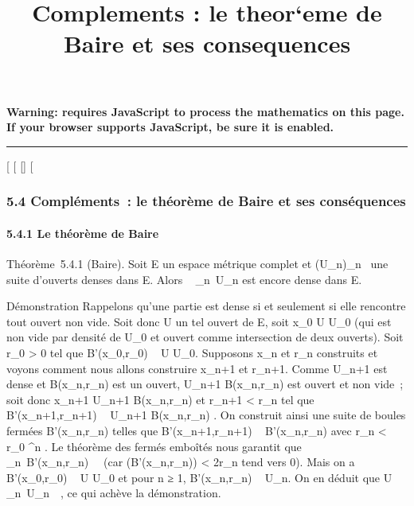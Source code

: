 \documentclass[]{article}
\title{Complements : le theor`eme de Baire et ses consequences}
\author{}
\date{}
\begin{document}
\maketitle

\textbf{Warning: 
requires JavaScript to process the mathematics on this page.\\ If your
browser supports JavaScript, be sure it is enabled.}

\begin{center}\rule{3in}{0.4pt}\end{center}

{[}
{[}
{[}{]}
{[}

\subsubsection{5.4 Compléments~: le théorème de Baire et ses
conséquences}

\paragraph{5.4.1 Le théorème de Baire}

Théorème~5.4.1 (Baire). Soit E un espace métrique complet et
(U\_n)\_n\in{}~ une suite d'ouverts denses dans E. Alors
\⋂ ~
\_n\in{}~U\_n est encore dense dans E.

Démonstration Rappelons qu'une partie est dense si et seulement si elle
rencontre tout ouvert non vide. Soit donc U un tel ouvert de E, soit
x\_0 \in U \bigcap U\_0 (qui est non vide par densité de
U\_0 et ouvert comme intersection de deux ouverts). Soit
r\_0 \textgreater{} 0 tel que B'(x\_0,r\_0) \subset~ U
\bigcap U\_0. Supposons x\_n et r\_n construits et
voyons comment nous allons construire x\_n+1 et r\_n+1.
Comme U\_n+1 est dense et B(x\_n,r\_n) est un
ouvert, U\_n+1 \bigcap B(x\_n,r\_n) est ouvert et non
vide~; soit donc x\_n+1 \in U\_n+1 \bigcap
B(x\_n,r\_n) et r\_n+1 \textless{}
r\_n  tel que
B'(x\_n+1,r\_n+1) \subset~ U\_n+1 \bigcap
B(x\_n,r\_n) . On construit ainsi une suite de boules
fermées B'(x\_n,r\_n) telles que
B'(x\_n+1,r\_n+1) \subset~ B'(x\_n,r\_n) avec
r\_n \textless{} r\_0 ^n . Le théorème des fermés emboîtés nous garantit que
\⋂ ~
\_n\in{}~B'(x\_n,r\_n)\neq~\varnothing~
(car \delta(B'(x\_n,r\_n)) \textless{} 2r\_n tend
vers 0). Mais on a B'(x\_0,r\_0) \subset~ U \bigcap U\_0 et
pour n ≥ 1, B'(x\_n,r\_n) \subset~ U\_n. On en déduit
que U \bigcap\⋂ ~
\_n\in{}~U\_n\neq~\varnothing~, ce qui achève la
démonstration.
\end{document}
